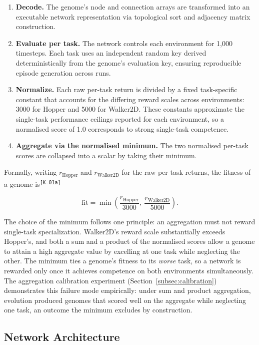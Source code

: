 \documentclass[12pt]{article}
\newcommand{\cohID}[1]{\textsuperscript{\scriptsize\texttt{[#1]}}}
\newcommand{\cohConsistency}[2]{\textcolor{cohConsistency}{#2}\cohID{#1}}
\begin{document}
\begin{enumerate}
    \item \textbf{Decode.} The genome's node and connection arrays are transformed into an executable network representation via topological sort and adjacency matrix construction.
    \item \textbf{Evaluate per task.} The network controls each environment for 1,000 timesteps. Each task uses an independent random key derived deterministically from the genome's evaluation key, ensuring reproducible episode generation across runs.
    \item \textbf{Normalize.} Each raw per-task return is divided by a fixed task-specific constant that accounts for the differing reward scales across environments: 3000 for Hopper and 5000 for Walker2D. These constants approximate the single-task performance ceilings reported for each environment, so a normalised score of 1.0 corresponds to strong single-task competence.
    \item \textbf{Aggregate via the normalised minimum.} The two normalised per-task scores are collapsed into a scalar by taking their minimum.
\end{enumerate}

\cohConsistency{K-01a}{Formally, writing $r_{\text{Hopper}}$ and $r_{\text{Walker2D}}$ for the raw per-task returns, the fitness of a genome is}

\[\text{fit} = \min\!\left(\frac{r_{\text{Hopper}}}{3000},\ \frac{r_{\text{Walker2D}}}{5000}\right).\]

The choice of the minimum follows one principle: an aggregation must not reward single-task specialization.
Walker2D's reward scale substantially exceeds Hopper's, and both a sum and a product of the normalised scores allow a genome to attain a high aggregate value by excelling at one task while neglecting the other.
The minimum ties a genome's fitness to its \emph{worse} task, so a network is rewarded only once it achieves competence on both environments simultaneously.
The aggregation calibration experiment (Section~\ref{subsec:calibration}) demonstrates this failure mode empirically: under sum and product aggregation, evolution produced genomes that scored well on the aggregate while neglecting one task, an outcome the minimum excludes by construction.

\subsection{Network Architecture}
\label{subsec:network-architecture}
\end{document}
